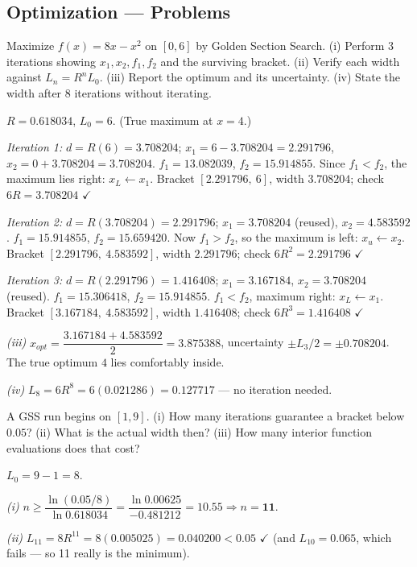 \subsection{Optimization --- Problems}

\begin{probbox}
 Maximize $f(x) = 8x - x^2$ on $[0,6]$ by Golden Section Search. (i) Perform 3 iterations showing $x_1,x_2,f_1,f_2$ and the surviving bracket. (ii) Verify each width against $L_n = R^nL_0$. (iii) Report the optimum and its uncertainty. (iv) State the width after 8 iterations without iterating.

\ans $R = 0.618034$, $L_0 = 6$. (True maximum at $x = 4$.)

\emph{Iteration 1:} $d = R(6) = 3.708204$; $x_1 = 6-3.708204 = 2.291796$, $x_2 = 0+3.708204 = 3.708204$.
$f_1 = 13.082039$, $f_2 = 15.914855$. Since $f_1 < f_2$, the maximum lies right: $x_L \leftarrow x_1$.
Bracket $[2.291796,\ 6]$, width $3.708204$; check $6R = 3.708204$ $\checkmark$

\emph{Iteration 2:} $d = R(3.708204) = 2.291796$; $x_1 = 3.708204$ (reused), $x_2 = 4.583592$.
$f_1 = 15.914855$, $f_2 = 15.659420$. Now $f_1 > f_2$, so the maximum is left: $x_u \leftarrow x_2$.
Bracket $[2.291796,\ 4.583592]$, width $2.291796$; check $6R^2 = 2.291796$ $\checkmark$

\emph{Iteration 3:} $d = R(2.291796) = 1.416408$; $x_1 = 3.167184$, $x_2 = 3.708204$ (reused).
$f_1 = 15.306418$, $f_2 = 15.914855$. $f_1 < f_2$, maximum right: $x_L \leftarrow x_1$.
Bracket $[3.167184,\ 4.583592]$, width $1.416408$; check $6R^3 = 1.416408$ $\checkmark$

\emph{(iii)} $x_{opt} = \dfrac{3.167184+4.583592}{2} = 3.875388$, uncertainty $\pm L_3/2 = \pm 0.708204$. The true optimum $4$ lies comfortably inside.

\emph{(iv)} $L_8 = 6R^8 = 6(0.021286) = \mathbf{0.127717}$ --- no iteration needed.

 A GSS run begins on $[1,9]$. (i) How many iterations guarantee a bracket below $0.05$? (ii) What is the actual width then? (iii) How many interior function evaluations does that cost?

\ans $L_0 = 9-1 = 8$.

\emph{(i)} $n \ge \dfrac{\ln(0.05/8)}{\ln 0.618034} = \dfrac{\ln 0.00625}{-0.481212} = 10.55 \Rightarrow n = \mathbf{11}$.

\emph{(ii)} $L_{11} = 8R^{11} = 8(0.005025) = \mathbf{0.040200} < 0.05$ $\checkmark$ (and $L_{10} = 0.065$, which fails --- so 11 really is the minimum).


\end{probbox}
